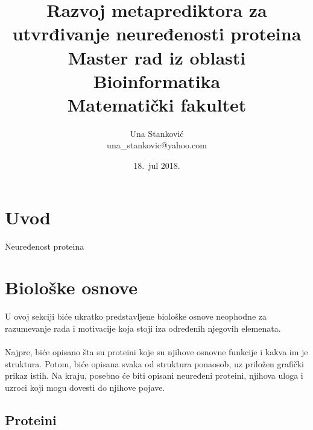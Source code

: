 \documentclass[a4paper]{article}
\begin{document}
\title{Razvoj metaprediktora za utvrđivanje neuređenosti proteina\\ \small{Master rad iz oblasti\\Bioinformatika\\ Matematički fakultet}}

\author{Una Stanković\\ una\_stankovic@yahoo.com}
\date{18.~jul 2018.}
\maketitle


\tableofcontents

\newpage

\section{Uvod}
\label{sec:uvod}
Neuređenost proteina 

\section{Biološke osnove}
\label{sec:prvi}
U ovoj sekciji biće ukratko predstavljene biološke osnove neophodne za razumevanje rada i motivacije koja stoji iza određenih njegovih elemenata.\\\\
Najpre, biće opisano šta su proteini koje su njihove osnovne funkcije i kakva im je struktura. Potom, biće opisana svaka od struktura ponaosob, uz priložen grafički prikaz istih. Na kraju, posebno će biti opisani neuređeni proteini, njihova uloga i uzroci koji mogu dovesti do njihove pojave. 

\subsection{Proteini}
\label{sec:proteini}
\end{document}
